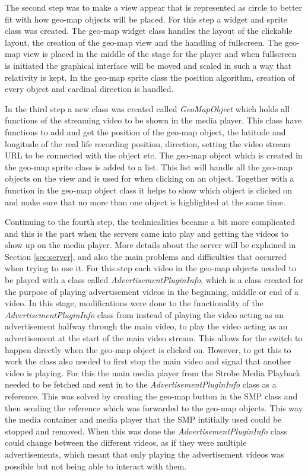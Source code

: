 The second step was to make a view appear that is represented as circle to better fit with how geo-map objects will be placed. For this step a widget and sprite class was created. The geo-map widget class handles the layout of the clickable layout, the creation of the geo-map view and the handling of fullscreen. The geo-map view is placed in the middle of the stage for the player and when fullscreen is initiated the graphical interface will be moved and scaled in such a way that relativity is kept. In the geo-map sprite class the position algorithm, creation of every object and cardinal direction is handled.

In the third step a new class was created called \textit{GeoMapObject} which holds all functions of the streaming video to be shown in the media player. This class have functions to add and get the position of the geo-map object, the latitude and longitude of the real life recording position, direction, setting the video stream URL to be connected with the object etc. The geo-map object which is created in the geo-map sprite class is added to a list. This list will handle all the geo-map objects on the view and is used for when clicking on an object. Together with a function in the geo-map object class it helps to show which object is clicked on and make sure that no more than one object is highlighted at the same time.

Continuing to the fourth step, the technicalities became a bit more complicated and this is the part when the servers came into play and getting the videos to show up on the media player. More details about the server will be explained in Section \ref{sec:server}, and also the main problems and difficulties that occurred when trying to use it. For this step each video in the geo-map objects needed to be played with a class called \textit{AdvertisementPluginInfo}, which is a class created for the purpose of playing advertisement videos in the beginning, middle or end of a video. In this stage, modifications were done to the functionality of the \textit{AdvertisementPluginInfo} class from instead of playing the video acting as an advertisement halfway through the main video, to play the video acting as an advertisement at the start of the main video stream. This allows for the switch to happen directly when the geo-map object is clicked on. However, to get this to work the class also needed to first stop the main video and signal that another video is playing. For this the main media player from the Strobe Media Playback needed to be fetched and sent in to the \textit{AdvertisementPluginInfo} class as a reference. This was solved by creating the geo-map button in the SMP class and then sending the reference which was forwarded to the geo-map objects. This way the media container and media player that the SMP intitially used could be stopped and removed. When this was done the \textit{AdvertisementPluginInfo} class could change between the different videos, as if they were multiple advertisements, which meant that only playing the advertisement videos was possible but not being able to interact with them. 

